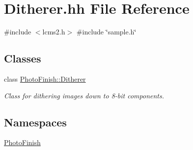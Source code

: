 \hypertarget{_ditherer_8hh}{}\section{Ditherer.\+hh File Reference}
\label{_ditherer_8hh}
{\ttfamily \#include $<$lcms2.\+h$>$}\newline
{\ttfamily \#include \char`\"{}sample.\+h\char`\"{}}\newline
\subsection*{Classes}
\begin{DoxyCompactItemize}
\item 
class \hyperlink{class_photo_finish_1_1_ditherer}{Photo\+Finish\+::\+Ditherer}
\begin{DoxyCompactList}\small\item\em Class for dithering images down to 8-\/bit components. \end{DoxyCompactList}\end{DoxyCompactItemize}
\subsection*{Namespaces}
\begin{DoxyCompactItemize}
\item 
 \hyperlink{namespace_photo_finish}{Photo\+Finish}
\end{DoxyCompactItemize}
